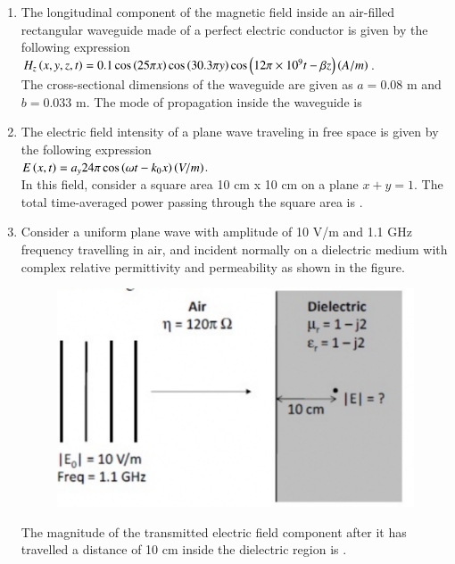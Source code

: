 \documentclass[a4paper, 11pt]{article}
\begin{document}
\begin{enumerate}
    \hfill{}

    \item The longitudinal component of the magnetic field inside an air-filled rectangular waveguide made of a perfect electric conductor is given by the following expression\\$H_{z}\left(x,y,z,t\right)=0.1 \cos\left(25\pi x\right)\cos\left(30.3 \pi y\right)\cos\left(12\pi\times10^{9}t-\beta z\right)\left(A/m\right)$.\\The cross-sectional dimensions of the waveguide are given as $a=0.08$ m and $b=0.033$ m. The mode of propagation inside the waveguide is
    \begin{enumerate}
    \end{enumerate}
    
    \hfill{}

    \item The electric field intensity of a plane wave traveling in free space is given by the following expression\\$E\left(x,t\right)=a_{y}24\pi \cos\left(\omega t-k_{0}x\right)\left(V/m\right)$.\\In this field, consider a square area 10 cm x 10 cm on a plane $x+y=1$. The total time-averaged power  passing through the square area is \underline{\hspace{2cm}}.
    
    \hfill{}

    \item Consider a uniform plane wave with amplitude  of 10 V/m and 1.1 GHz frequency travelling in air, and incident normally on a dielectric medium with complex relative permittivity  and permeability  as shown in the figure.
    \begin{figure}[H]
        \centering
        \includegraphics[width=0.7\columnwidth]{figs/q65.png}
        \caption*{}
        \label{fig:q65}
    \end{figure}
    The magnitude of the transmitted electric field component  after it has travelled a distance of 10 cm inside the dielectric region is \underline{\hspace{2cm}}.
    
    \hfill{}

\end{enumerate}
\end{document}
